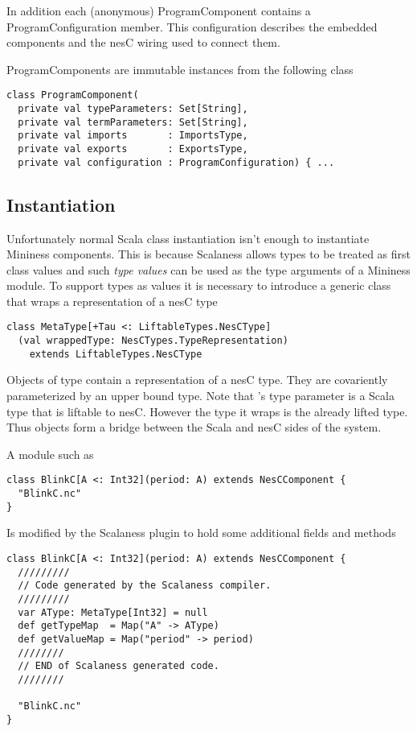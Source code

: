 In addition each (anonymous) ProgramComponent contains a ProgramConfiguration member. This
configuration describes the embedded components and the nesC wiring used to connect them.

ProgramComponents are immutable instances from the following class

\singlespace
\begin{lstlisting}
class ProgramComponent(
  private val typeParameters: Set[String],
  private val termParameters: Set[String],
  private val imports       : ImportsType,
  private val exports       : ExportsType,
  private val configuration : ProgramConfiguration) { ...
\end{lstlisting}
\primaryspacing

\subsection{Instantiation}

Unfortunately normal Scala class instantiation isn't enough to instantiate Mininess components.
This is because Scalaness allows types to be treated as first class values and such \textit{type
  values} can be used as the type arguments of a Mininess module. To support types as values it
is necessary to introduce a generic class that wraps a representation of a nesC type

\singlespace
\begin{lstlisting}
class MetaType[+Tau <: LiftableTypes.NesCType]
  (val wrappedType: NesCTypes.TypeRepresentation)
    extends LiftableTypes.NesCType
\end{lstlisting}
\primaryspacing

Objects of type  contain a representation of a nesC type. They are
covariently parameterized by an upper bound type. Note that 's type
parameter is a Scala type that is liftable to nesC. However the type it wraps is the already
lifted type. Thus  objects form a bridge between the Scala and nesC sides
of the system.

A module such as

\singlespace
\begin{lstlisting}
class BlinkC[A <: Int32](period: A) extends NesCComponent {
  "BlinkC.nc"
}
\end{lstlisting}
\primaryspacing

Is modified by the Scalaness plugin to hold some additional fields and methods

\singlespace
\begin{lstlisting}
class BlinkC[A <: Int32](period: A) extends NesCComponent {
  /////////
  // Code generated by the Scalaness compiler.
  /////////
  var AType: MetaType[Int32] = null
  def getTypeMap  = Map("A" -> AType)
  def getValueMap = Map("period" -> period)
  ////////
  // END of Scalaness generated code.
  ////////

  "BlinkC.nc"
}
\end{lstlisting}
\primaryspacing

